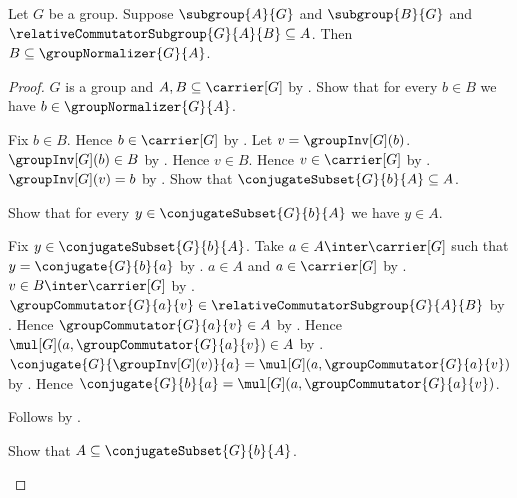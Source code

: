 \begin{theorem}\label{subgroup_subset_normalizer_of_relative_commutator_le}
    Let $G$ be a group.
    Suppose $\subgroup{A}{G}$ and $\subgroup{B}{G}$ and
        $\relativeCommutatorSubgroup{G}{A}{B}\subseteq A$.
    Then $B\subseteq\groupNormalizer{G}{A}$.
\end{theorem}
\begin{proof}
    $G$ is a group and $A,B\subseteq\carrier[G]$ by
        .
    Show that for every $b\in B$ we have
        $b\in\groupNormalizer{G}{A}$.
    \begin{subproof}
        Fix $b\in B$.
        Hence $b\in\carrier[G]$ by .
        Let $v=\groupInv[G](b)$.
        $\groupInv[G](b)\in B$ by .
        Hence $v\in B$.
        Hence $v\in\carrier[G]$ by .
        $\groupInv[G](v)=b$ by
            .
        Show that $\conjugateSubset{G}{b}{A}\subseteq A$.
        \begin{subproof}
            Show that for every $y\in\conjugateSubset{G}{b}{A}$ we have
                $y\in A$.
            \begin{subproof}
                Fix $y\in\conjugateSubset{G}{b}{A}$.
                Take $a\in A\inter\carrier[G]$ such that
                    $y=\conjugate{G}{b}{a}$ by
                    .
                $a\in A$ and $a\in\carrier[G]$ by
                    .
                $v\in B\inter\carrier[G]$ by .
                $\groupCommutator{G}{a}{v}\in
                    \relativeCommutatorSubgroup{G}{A}{B}$ by
                    .
                Hence $\groupCommutator{G}{a}{v}\in A$ by
                    .
                Hence
                    $\mul[G](a,\groupCommutator{G}{a}{v})\in A$ by
                    .
                $\conjugate{G}{\groupInv[G](v)}{a}=
                    \mul[G](a,\groupCommutator{G}{a}{v})$ by
                    .
                Hence $\conjugate{G}{b}{a}=
                    \mul[G](a,\groupCommutator{G}{a}{v})$.
            \end{subproof}
            Follows by .
        \end{subproof}
        Show that $A\subseteq\conjugateSubset{G}{b}{A}$.
        \begin{subproof}

\end{subproof}
\end{subproof}
\end{proof}
